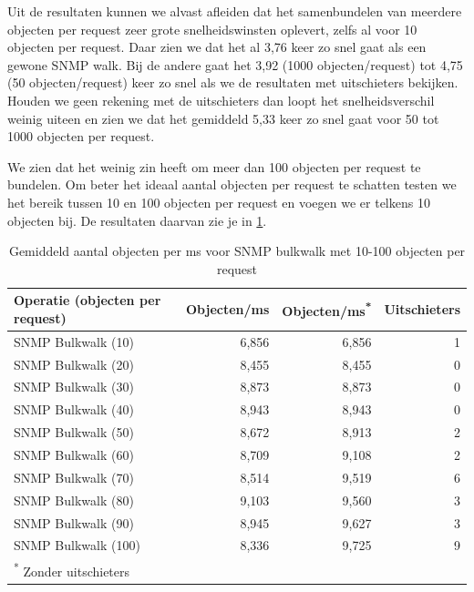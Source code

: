 Uit de resultaten kunnen we alvast afleiden dat het samenbundelen van meerdere objecten per request zeer grote snelheidswinsten oplevert,
zelfs al voor 10 objecten per request.
Daar zien we dat het al 3,76 keer zo snel gaat als een gewone SNMP walk.
Bij de andere gaat het 3,92 (1000 objecten/request) tot 4,75 (50 objecten/request) keer zo snel als we de resultaten met uitschieters bekijken.
Houden we geen rekening met de uitschieters dan loopt het snelheidsverschil weinig uiteen en zien we
dat het gemiddeld 5,33 keer zo snel gaat voor 50 tot 1000 objecten per request.

We zien dat het weinig zin heeft om meer dan 100 objecten per request te bundelen.
Om beter het ideaal aantal objecten per request te schatten testen we het bereik tussen 10 en 100 objecten per request en voegen we er telkens 10 objecten bij.
De resultaten daarvan zie je in \cref{tabel-bulkrequests-bulksizes}.

\begin{table}[h]
\centering
\begin{tabular}{@{}lrrr@{}}
\toprule
Operatie (objecten per request) & Objecten/ms & Objecten/ms\textsuperscript{*} & Uitschieters \\ \midrule
SNMP Bulkwalk (10)              & 6,856       & 6,856         & 1            \\
SNMP Bulkwalk (20)              & 8,455       & 8,455         & 0            \\
SNMP Bulkwalk (30)              & 8,873       & 8,873         & 0            \\
SNMP Bulkwalk (40)              & 8,943       & 8,943         & 0            \\
SNMP Bulkwalk (50)              & 8,672       & 8,913         & 2            \\
SNMP Bulkwalk (60)              & 8,709       & 9,108         & 2            \\
SNMP Bulkwalk (70)              & 8,514       & 9,519         & 6            \\
SNMP Bulkwalk (80)              & 9,103       & 9,560         & 3            \\
SNMP Bulkwalk (90)              & 8,945       & 9,627         & 3            \\
SNMP Bulkwalk (100)             & 8,336       & 9,725         & 9            \\ \midrule[.5pt]
\multicolumn{4}{l}{\textsuperscript{*} \footnotesize{Zonder uitschieters}}
\end{tabular}
\caption{Gemiddeld aantal objecten per ms voor SNMP bulkwalk met 10-100 objecten per request}
\label{tabel-bulkrequests-bulksizes}
\end{table}

